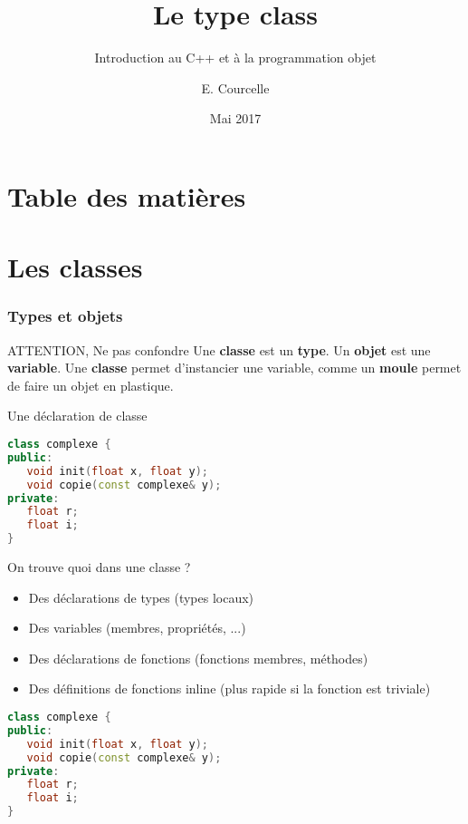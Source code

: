 \documentclass{beamer}
\title{Le type class}
\subtitle{Introduction au C++ et à la programmation objet}
\author{E. Courcelle}\institute{CALMIP, UMS 3669}
\date{Mai 2017}
\begin{document}
\begin{frame}
\titlepage
\end{frame}

\section*{Table des matières}
\begin{frame}
\tableofcontents
\end{frame}


\section{Les classes}

\begin{frame}[fragile=singleslide,shrink=20]
\frametitle {Types et objets}

\begin{block}{ATTENTION, Ne pas confondre}
Une \textbf{classe} est un \textbf{type}.
Un \textbf{objet} est une \textbf{variable}.
Une \textbf{classe} permet d'instancier une variable, comme un \textbf{moule} permet de faire un objet en plastique.
\end{block}

\begin{block}{Une déclaration de classe}
\begin{lstlisting}[language=c++]
class complexe {
public:
   void init(float x, float y);
   void copie(const complexe& y);
private:
   float r;
   float i;
}
\end{lstlisting}
\end{block}

\begin{block}{On trouve quoi dans une classe ?}
\begin{itemize}
\item{Des déclarations de types (types locaux)}
\item{Des variables (membres, propriétés, ...)}
\item{Des déclarations de fonctions (fonctions membres, méthodes)}
\item{Des définitions de fonctions inline (plus rapide si la fonction est triviale)}
\end{itemize}
\begin{lstlisting}[language=c++]
class complexe {
public:
   void init(float x, float y);
   void copie(const complexe& y);
private:
   float r;
   float i;
}
\end{lstlisting}
\end{block}
\end{frame}
\end{document}
